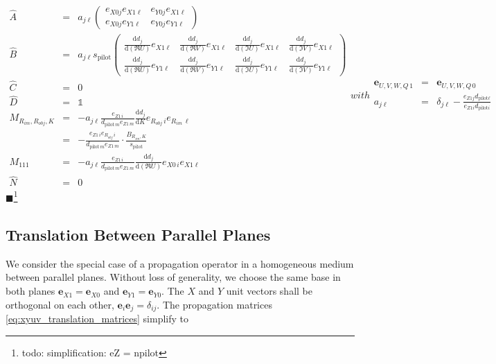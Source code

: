 \documentclass[12pt,a4paper,twoside,openright,BCOR10mm,headsepline,titlepage,abstracton,chapterprefix,final]{scrreprt}
\newcommand\Vector[1]{{\mathbf{#1}}}
\newcommand\unittensor{\mathds{1}}
\newcommand{\remark}[1]{{\color{red}$\blacksquare$}\footnote{{\color{red}#1}}}
\newcommand\totald{\textrm{d}}
\newcommand\pilot{\textrm{pilot}}
\begin{document}
\begin{subequations} \label{eq:xyuv_translation_matrices}
\begin{eqnarray}
 \hat{A} &=& a_{j\ell}
 \begin{pmatrix}
  e_{X0j} e_{X1\ell} & e_{Y0j} e_{X1\ell} \\
  e_{X0j} e_{Y1\ell} & e_{Y0j} e_{Y1\ell}
 \end{pmatrix}
\\
 \hat{B} &=& a_{j\ell} s_{\pilot} 
 \begin{pmatrix}
 \frac{\totald d_j}{\totald (\Re U)} e_{X1\ell} & \frac{\totald d_j}{\totald (\Re V)} e_{X1\ell} & \frac{\totald d_j}{\totald (\Im U)} e_{X1\ell} & \frac{\totald d_j}{\totald (\Im V)} e_{X1\ell} \\
 \frac{\totald d_j}{\totald (\Re U)} e_{Y1\ell} & \frac{\totald d_j}{\totald (\Re V)} e_{Y1\ell} & \frac{\totald d_j}{\totald (\Im U)} e_{Y1\ell} & \frac{\totald d_j}{\totald (\Im V)} e_{Y1\ell}
 \end{pmatrix}
\\
\hat{C} &=& 0 \\
\hat{D} &=& \unittensor \\
M_{R_{im}, R_{obj}, K} &=& - a_{j\ell} \frac{ e_{Z1\,i} }{d_{\pilot\,m} e_{Z1\,m}} \frac{\totald d_{j}}{\totald K} e_{R_{obj}\,i} e_{R_{im}\,\ell}  \\
        &=& - \frac{ e_{Z1\,i} e_{R_{obj}\,i} }{d_{\pilot\,m} e_{Z1\,m}} \cdot \frac{B_{R_{im}, K}}{s_{\pilot}}\\
M_{111} &=& - a_{j\ell} \frac{ e_{Z1\,i} }{d_{\pilot\,m} e_{Z1\,m}} \frac{\totald d_{j}}{\totald (\Re U)} e_{X0\,i} e_{X1\ell}  \\
\hat{N} &=& 0
\end{eqnarray}
with
\begin{eqnarray}
 \Vector{e}_{U,V,W,Q\,1} &=& \Vector{e}_{U,V,W,Q\,0} 
 \\
 a_{j\ell} &=& \delta_{j\ell} -  \frac{e_{Z1j} d_{\pilot\ell} }{e_{Z1i} d_{\pilot i}}
\end{eqnarray}
\end{subequations}
\remark{todo: simplification: eZ = npilot}

\subsection{Translation Between Parallel Planes}
We consider the special case of a propagation operator in a homogeneous medium between parallel planes.
Without loss of generality, we choose the same base in both planes $\Vector{e}_{X1} = \Vector{e}_{X0}$ and $\Vector{e}_{Y1} = \Vector{e}_{Y0}$.
The $X$ and $Y$ unit vectors shall be orthogonal on each other, $\Vector{e}_i \Vector{e}_j = \delta_{ij}$.
The propagation matrices \eqref{eq:xyuv_translation_matrices} simplify to
\end{document}
